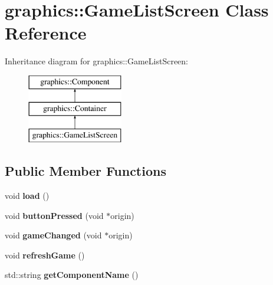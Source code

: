 \hypertarget{classgraphics_1_1_game_list_screen}{\section{graphics\-:\-:Game\-List\-Screen Class Reference}
\label{classgraphics_1_1_game_list_screen}
}
Inheritance diagram for graphics\-:\-:Game\-List\-Screen\-:\begin{figure}[H]
\begin{center}
\leavevmode
\includegraphics[height=3.000000cm]{classgraphics_1_1_game_list_screen}
\end{center}
\end{figure}
\subsection*{Public Member Functions}
\begin{DoxyCompactItemize}
\item 
\hypertarget{classgraphics_1_1_game_list_screen_a24d7e6e750f5ec08554e9ed6e9f82ecd}{void {\bfseries load} ()}\label{classgraphics_1_1_game_list_screen_a24d7e6e750f5ec08554e9ed6e9f82ecd}

\item 
\hypertarget{classgraphics_1_1_game_list_screen_a926d9665856e3a958ffba47ce8da5f16}{void {\bfseries button\-Pressed} (void $\ast$origin)}\label{classgraphics_1_1_game_list_screen_a926d9665856e3a958ffba47ce8da5f16}

\item 
\hypertarget{classgraphics_1_1_game_list_screen_a1f4615d1a5624c58b92525509b73d17b}{void {\bfseries game\-Changed} (void $\ast$origin)}\label{classgraphics_1_1_game_list_screen_a1f4615d1a5624c58b92525509b73d17b}

\item 
\hypertarget{classgraphics_1_1_game_list_screen_afee32605d7a9ab570c1084077c82ac9f}{void {\bfseries refresh\-Game} ()}\label{classgraphics_1_1_game_list_screen_afee32605d7a9ab570c1084077c82ac9f}

\item 
\hypertarget{classgraphics_1_1_game_list_screen_aea5ce02aeb01d38849c1686016b51077}{std\-::string {\bfseries get\-Component\-Name} ()}\label{classgraphics_1_1_game_list_screen_aea5ce02aeb01d38849c1686016b51077}

\end{DoxyCompactItemize}
